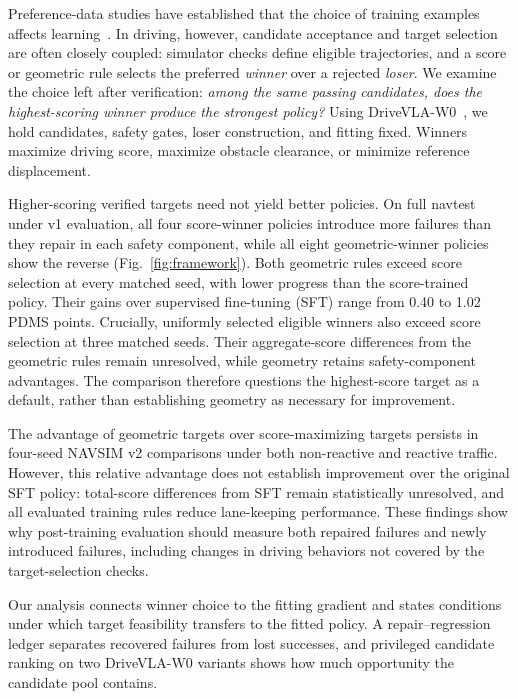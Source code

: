 \documentclass[letterpaper,10pt,conference]{ieeeconf}
\begin{document}
Preference-data studies have established that the choice of training examples affects learning~\cite{sweetspot,whatmatters,correctanswers}. In driving, however, candidate acceptance and target selection are often closely coupled: simulator checks define eligible trajectories, and a score or geometric rule selects the preferred \emph{winner} over a rejected \emph{loser}. We examine the choice left after verification: \emph{among the same passing candidates, does the highest-scoring winner produce the strongest policy?} Using DriveVLA-W0~\cite{drivevla}, we hold candidates, safety gates, loser construction, and fitting fixed. Winners maximize driving score, maximize obstacle clearance, or minimize reference displacement. 

Higher-scoring verified targets need not yield better policies. On full navtest under v1 evaluation, all four score-winner policies introduce more failures than they repair in each safety component, while all eight geometric-winner policies show the reverse (Fig.~\ref{fig:framework}). Both geometric rules exceed score selection at every matched seed, with lower progress than the score-trained policy. Their gains over supervised fine-tuning (SFT) range from 0.40 to 1.02 PDMS points. Crucially, uniformly selected eligible winners also exceed score selection at three matched seeds. Their aggregate-score differences from the geometric rules remain unresolved, while geometry retains safety-component advantages. The comparison therefore questions the highest-score target as a default, rather than establishing geometry as necessary for improvement.

The advantage of geometric targets over score-maximizing
targets persists in four-seed NAVSIM v2 comparisons under
both non-reactive and reactive traffic. However, this relative
advantage does not establish improvement over the original
SFT policy: total-score differences from SFT remain
statistically unresolved, and all evaluated training rules
reduce lane-keeping performance. These findings show why
post-training evaluation should measure both repaired failures
and newly introduced failures, including changes in driving
behaviors not covered by the target-selection checks.

Our analysis connects winner choice to the fitting gradient and states conditions under which target feasibility transfers to the fitted policy. A repair--regression ledger separates recovered failures from lost successes, and privileged candidate ranking on two DriveVLA-W0 variants shows how much opportunity the candidate pool contains.
\end{document}
